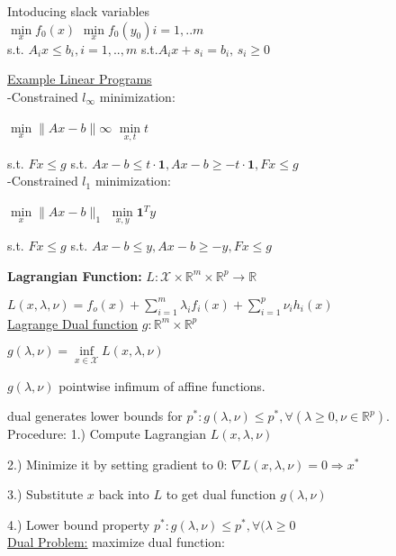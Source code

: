 \documentclass[10pt,parskip]{scrartcl}
\begin{document}
\begin{multicols*}{3}
Intoducing slack variables\\
$\min\limits_{x} f_0(x)$ \hspace*{30mm} $\min\limits_{x} f_0(y_0)$\hspace*{10mm}$ i = 1,..m$\\
s.t. $A_i x\leq b_i, i = 1,..,m$ \hspace*{10mm} s.t.$ A_i x+ s_i = b_i, \, s_i \geq 0$


\underline{Example Linear Programs}\\
-Constrained $l_\infty$ minimization:

$\min\limits_{x} \|A x - b\|\infty$ \hspace*{4mm} $\min\limits_{x,t} t$

s.t. $F x \leq g$ \hspace*{10mm} s.t. $A x - b \leq t \cdot \mathbf 1, A x - b \geq -t \cdot\mathbf  1, F x \leq g$\\
-Constrained $l_1$ minimization:

$\min\limits_{x} \|A x - b\|_1$ \hspace*{4mm} $\min\limits_{x,y} \mathbf 1^T y$

s.t. $F x \leq g$ \hspace*{10mm} s.t. $A x - b \leq y, A x - b \geq -y , F x \leq g$


\textbf{Lagrangian Function:} $L:\mathcal X \times \mathbb R^m \times \mathbb R^p \rightarrow \mathbb R$


$L(x,\lambda, \nu) = f_o(x) + \sum_{i=1}^m \lambda_i f_i(x) + \sum_{i=1}^p \nu_i h_i(x)$\\
\underline{Lagrange Dual function} $g: \mathbb R^m \times \mathbb R^p$

$g(\lambda, \nu) = \inf \limits_{x \in \mathcal X} L(x, \lambda, \nu)$

$g(\lambda, \nu)$ pointwise infimum of affine functions.

dual generates lower bounds for $p^*: g(\lambda, \nu) \leq p^*, \forall(\lambda \geq 0, \nu \in \mathbb R^p)$.\\
Procedure:
1.) Compute Lagrangian $L(x,\lambda, \nu)$

2.) Minimize it by setting gradient to 0: $\nabla L(x,\lambda, \nu)=0 \Rightarrow x^*$

3.) Substitute $x$ back into $L$ to get dual function $g(\lambda, \nu)$

4.) Lower bound property $p^*: g(\lambda, \nu) \leq p^*, \forall(\lambda \geq 0$\\
\underline{Dual Problem:} maximize dual function:


\end{multicols*}
\end{document}
